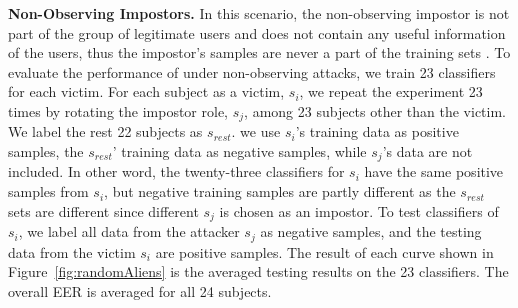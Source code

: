 \noindent \textbf{Non-Observing Impostors.} 
In this scenario, the non-observing impostor  is not part of the group of legitimate users and does not contain any useful information of the users, thus the impostor's samples are never a part of the training sets . To evaluate the performance of \CiT under non-observing attacks, we train 23 classifiers for each victim. For each subject as a victim, $s_i$, we repeat the experiment 23 times by rotating the impostor role, $s_j$, among 23 subjects other than the victim. 
We label the rest 22 subjects as $s_{rest}$. 
we use $s_i$'s training data as positive samples, the $s_{rest}$' training data as negative samples, while $s_j$'s data are not included. 
In other word, the twenty-three classifiers for $s_i$ have the same positive samples from $s_i$, but negative training samples are partly different as the $s_{rest}$ sets are different since different $s_j$ is chosen as an impostor. 
To test classifiers of $s_i$, we label all data from the attacker $s_j$ as negative samples, and the testing data from the victim $s_i$ are positive samples. The result of each curve shown in Figure~\ref{fig:randomAliens} is the averaged testing results on the 23 classifiers. The overall EER is  averaged for all 24 subjects.







